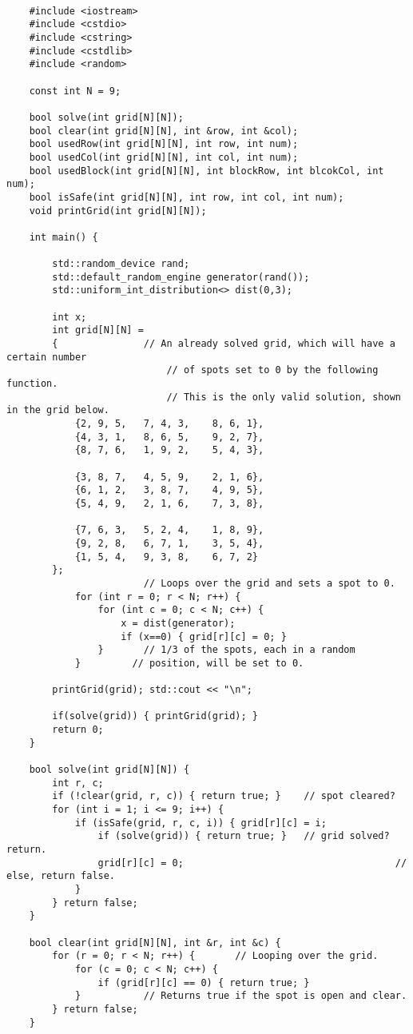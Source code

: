 \documentclass[11pt]{amsart}
\begin{document}
\begin{verbatim}

	#include <iostream>
	#include <cstdio>
	#include <cstring>
	#include <cstdlib>
	#include <random>

	const int N = 9;

	bool solve(int grid[N][N]);
	bool clear(int grid[N][N], int &row, int &col);
	bool usedRow(int grid[N][N], int row, int num);
	bool usedCol(int grid[N][N], int col, int num);
	bool usedBlock(int grid[N][N], int blockRow, int blcokCol, int num);
	bool isSafe(int grid[N][N], int row, int col, int num);
	void printGrid(int grid[N][N]);

	int main() {

	    std::random_device rand;
	    std::default_random_engine generator(rand());
	    std::uniform_int_distribution<> dist(0,3);

	    int x;
	    int grid[N][N] =
	    {				// An already solved grid, which will have a certain number
							// of spots set to 0 by the following function.
							// This is the only valid solution, shown in the grid below.
	        {2, 9, 5,   7, 4, 3,    8, 6, 1},
	        {4, 3, 1,   8, 6, 5,    9, 2, 7},
	        {8, 7, 6,   1, 9, 2,    5, 4, 3},

	        {3, 8, 7,   4, 5, 9,    2, 1, 6},
	        {6, 1, 2,   3, 8, 7,    4, 9, 5},
	        {5, 4, 9,   2, 1, 6,    7, 3, 8},

	        {7, 6, 3,   5, 2, 4,    1, 8, 9},
	        {9, 2, 8,   6, 7, 1,    3, 5, 4},
	        {1, 5, 4,   9, 3, 8,    6, 7, 2}
	    };
						// Loops over the grid and sets a spot to 0.
	        for (int r = 0; r < N; r++) {
	            for (int c = 0; c < N; c++) {
	                x = dist(generator);
	                if (x==0) { grid[r][c] = 0; }
	            }		// 1/3 of the spots, each in a random
	        } 		  // position, will be set to 0.

	    printGrid(grid); std::cout << "\n";

	    if(solve(grid)) { printGrid(grid); }
	    return 0;
	}

	bool solve(int grid[N][N]) {
	    int r, c;
	    if (!clear(grid, r, c)) { return true; }	// spot cleared?
	    for (int i = 1; i <= 9; i++) {
	        if (isSafe(grid, r, c, i)) { grid[r][c] = i;
	            if (solve(grid)) { return true; }	// grid solved? return.
	            grid[r][c] = 0;										// else, return false.
	        }
	    } return false;
	}

	bool clear(int grid[N][N], int &r, int &c) {
	    for (r = 0; r < N; r++) {		// Looping over the grid.
	        for (c = 0; c < N; c++) {
	            if (grid[r][c] == 0) { return true; }
	        }			// Returns true if the spot is open and clear.
	    } return false;
	}


\end{verbatim}
\end{document}
